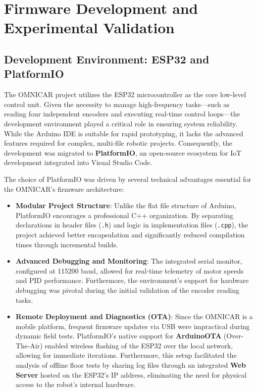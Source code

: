 \chapter{Firmware Development and Experimental Validation}
\label{chap:firmware}

\section{Development Environment: ESP32 and PlatformIO}

The OMNICAR project utilizes the ESP32 microcontroller as the core low-level control unit. Given the necessity to manage high-frequency tasks—such as reading four independent encoders and executing real-time control loops—the development environment played a critical role in ensuring system reliability. While the Arduino IDE is suitable for rapid prototyping, it lacks the advanced features required for complex, multi-file robotic projects. Consequently, the development was migrated to \textbf{PlatformIO}, an open-source ecosystem for IoT development integrated into Visual Studio Code.

The choice of PlatformIO was driven by several technical advantages essential for the OMNICAR's firmware architecture:

\begin{itemize}
    \item \textbf{Modular Project Structure}: Unlike the flat file structure of Arduino, PlatformIO encourages a professional C++ organization. By separating declarations in header files (\texttt{.h}) and logic in implementation files (\texttt{.cpp}), the project achieved better encapsulation and significantly reduced compilation times through incremental builds.
    \item \textbf{Advanced Debugging and Monitoring}: The integrated serial monitor, configured at 115200 baud, allowed for real-time telemetry of motor speeds and PID performance. Furthermore, the environment's support for hardware debugging was pivotal during the initial validation of the encoder reading tasks.
    \item \textbf{Remote Deployment and Diagnostics (OTA)}: Since the OMNICAR is a mobile platform, frequent firmware updates via USB were impractical during dynamic field tests. PlatformIO's native support for \textbf{ArduinoOTA} (Over-The-Air) enabled wireless flashing of the ESP32 over the local network, allowing for immediate iterations. Furthermore, this setup facilitated the analysis of offline floor tests by sharing log files through an integrated \textbf{Web Server} hosted on the ESP32's IP address, eliminating the need for physical access to the robot's internal hardware.
\end{itemize}

